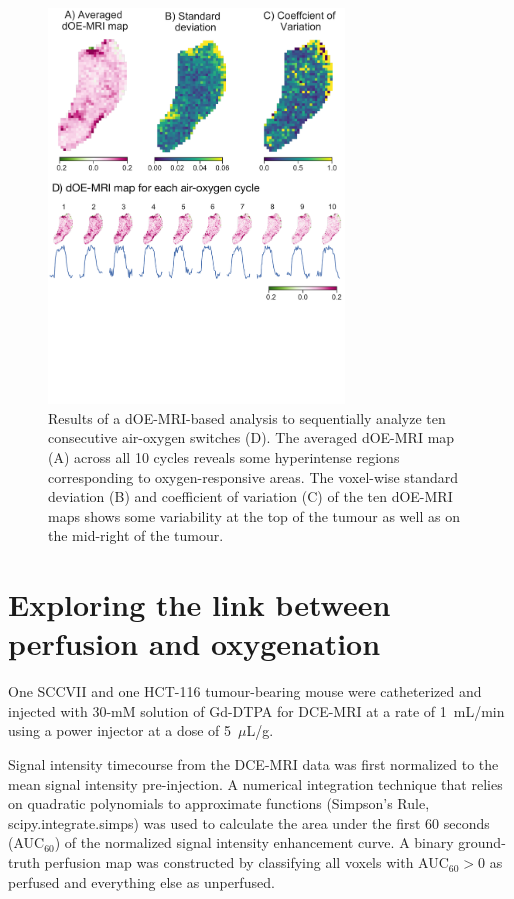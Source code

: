 \begin{figure}[htbp]  
   \centering
   \includegraphics[width=0.7\textwidth]{futurework/futurework-images/cyclingHypoxia.pdf} %
   \caption{Results of a \acs{dOE-MRI}-based analysis to sequentially analyze ten consecutive air-oxygen switches (D). The averaged \acs{dOE-MRI} map (A) across all 10 cycles reveals some hyperintense regions corresponding to oxygen-responsive areas. The voxel-wise standard deviation (B) and coefficient of variation (C) of the ten \acs{dOE-MRI} maps shows some variability at the top of the tumour as well as on the mid-right of the tumour.}
   \label{longcycles}
\end{figure}

\section{Exploring the link between perfusion and oxygenation}

One SCCVII and one HCT-116 tumour-bearing mouse were catheterized and injected with 30-mM solution of Gd-DTPA for \acs{DCE-MRI} at a rate of 1~mL/min using a power injector at a dose of 5~$\mu$L/g.

Signal intensity timecourse from the \acs{DCE-MRI} data was first normalized to the mean signal intensity pre-injection.
A numerical integration technique that relies on quadratic polynomials to approximate functions (Simpson's Rule, scipy.integrate.simps) was used to calculate the area under the first 60 seconds (\acs{AUC}$_{60}$) of the normalized signal intensity enhancement curve.
A binary ground-truth perfusion map was constructed by classifying all voxels with AUC$_{60} > 0$ as perfused and everything else as unperfused.

